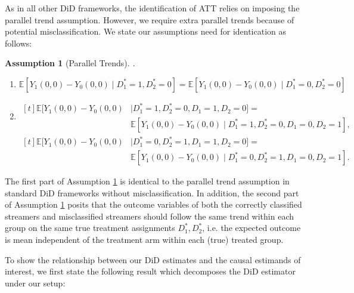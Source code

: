 \documentclass[a4paper,12pt]{article}
\newtheorem{assumption}{Assumption}
\begin{document}
As in all other DiD frameworks, the identification of ATT relies on imposing the parallel trend assumption. However, we require extra parallel trends because of potential misclassification. We state our assumptions need for identication as follows:

\begin{assumption}[Parallel Trends].\label{assumption-PT}
    \begin{enumerate}
        \item $\mathbb{E}[Y_1(0,0) - Y_0(0,0) \mid D_1^\ast = 1, D_2^\ast = 0] = \mathbb{E}[Y_1(0,0) - Y_0(0,0) \mid D_1^\ast = 0, D_2^\ast = 0]$
        \item 
        $\begin{aligned}[t]
            \mathbb{E}[Y_1(0,0)-Y_0(0,0) &\mid D_1^\ast=1, D_2^\ast=0, D_1=1,D_2=0] = \\
            &\mathbb{E}[Y_1(0,0)-Y_0(0,0) \mid D_1^\ast=1, D_2^\ast=0, D_1=0,D_2=1],
        \end{aligned}$\\[1ex]
        $\begin{aligned}[t]
            \mathbb{E}[Y_1(0,0)-Y_0(0,0) &\mid D_1^\ast=0, D_2^\ast=1, D_1=1,D_2=0] = \\
            &\mathbb{E}[Y_1(0,0)-Y_0(0,0) \mid D_1^\ast=0, D_2^\ast=1, D_1=0,D_2=1].
        \end{aligned}$
    \end{enumerate}
\end{assumption}

The first part of Assumption \ref{assumption-PT} is identical to the parallel trend assumption in standard DiD frameworks without misclassification. In addition, the second part of Assumption \ref{assumption-PT} posits that the outcome variables of both the correctly classified streamers and misclassified streamers should follow the same trend within each group  on the same true treatment assignments $D_1^\ast, D_2^\ast$, i.e. the expected outcome is mean independent of the treatment arm within each (true) treated group.

To show the relationship between our DiD estimates and the causal estimands of interest, we first state the following result which decomposes the DiD estimator under our setup:
\end{document}
